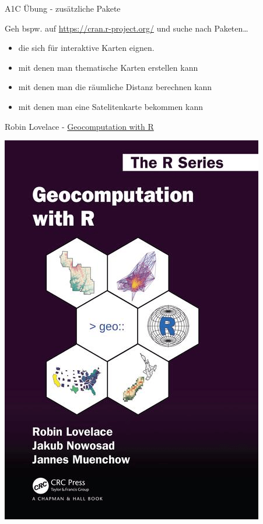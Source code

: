 \documentclass[ignorenonframetext,]{beamer}
\providecommand{\tightlist}{%
  \setlength{\itemsep}{0pt}\setlength{\parskip}{0pt}}
\begin{document}
\begin{frame}{A1C Übung - zusätzliche Pakete}

Geh bspw. auf \url{https://cran.r-project.org/} und suche nach
Paketen\ldots{}

\begin{itemize}
\tightlist
\item
  die sich für interaktive Karten eignen.
\item
  mit denen man thematische Karten erstellen kann
\item
  mit denen man die räumliche Distanz berechnen kann
\item
  mit denen man eine Satelitenkarte bekommen kann
\end{itemize}

\end{frame}

\begin{frame}{Robin Lovelace -
\href{https://geocompr.robinlovelace.net/}{Geocomputation with R}}

\includegraphics{figure/cover_lovelace.png}

\end{frame}
\end{document}
